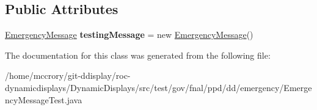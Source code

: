 \subsection*{Public Attributes}
\begin{DoxyCompactItemize}
\item 
\hypertarget{classtest_1_1gov_1_1fnal_1_1ppd_1_1dd_1_1emergency_1_1EmergencyMessageTest_ac50866e8af838c909afcc4e19d058274}{\hyperlink{classgov_1_1fnal_1_1ppd_1_1dd_1_1emergency_1_1EmergencyMessage}{Emergency\-Message} {\bfseries testing\-Message} = new \hyperlink{classgov_1_1fnal_1_1ppd_1_1dd_1_1emergency_1_1EmergencyMessage}{Emergency\-Message}()}\label{classtest_1_1gov_1_1fnal_1_1ppd_1_1dd_1_1emergency_1_1EmergencyMessageTest_ac50866e8af838c909afcc4e19d058274}

\end{DoxyCompactItemize}


The documentation for this class was generated from the following file\-:\begin{DoxyCompactItemize}
\item 
/home/mccrory/git-\/ddisplay/roc-\/dynamicdisplays/\-Dynamic\-Displays/src/test/gov/fnal/ppd/dd/emergency/Emergency\-Message\-Test.\-java\end{DoxyCompactItemize}
